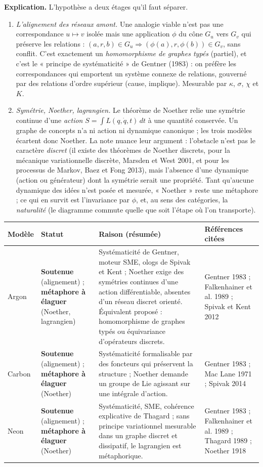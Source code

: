 \documentclass[a4paper,11pt]{article}
\makeatletter
\newenvironment{avis}{\small\renewcommand{\arraystretch}{1.15}%
\begin{longtable}{@{}>{\raggedright\arraybackslash}p{1.35cm}>{\raggedright\arraybackslash}p{2.45cm}>{\raggedright\arraybackslash}p{7.15cm}>{\raggedright\arraybackslash}p{4.4cm}@{}}
\toprule \textbf{Modèle} & \textbf{Statut} & \textbf{Raison (résumée)} & \textbf{Références citées}\\ \midrule \endhead
\bottomrule \endfoot}{\end{longtable}}
\newcommand{\st}[1]{\textbf{#1}}
\makeatother
\begin{document}
\textbf{Explication.} L'hypothèse a deux étages qu'il faut séparer.
\begin{enumerate}[itemsep=1pt]
\item \emph{L'alignement des réseaux amont.} Une analogie viable n'est pas une correspondance $u\mapsto v$ isolée mais une application $\phi$ du cône $G_u$ vers $G_v$ qui préserve les relations : $(a,r,b)\in G_u \Rightarrow (\phi(a),r,\phi(b))\in G_v$, sans conflit. C'est exactement un \emph{homomorphisme de graphes typés} (partiel), et c'est le « principe de systématicité » de Gentner (1983) : on préfère les correspondances qui emportent un système connexe de relations, gouverné par des relations d'ordre supérieur (cause, implique). Mesurable par $\kappa$, $\sigma$, $\chi$ et $K$.
\item \emph{Symétrie, Noether, lagrangien.} Le théorème de Noether relie une symétrie continue d'une \emph{action} $S=\int L(q,\dot q,t)\,dt$ à une quantité conservée. Un graphe de concepts n'a ni action ni dynamique canonique ; les trois modèles écartent donc Noether. La note nuance leur argument : l'obstacle n'est pas le caractère \emph{discret} (il existe des théorèmes de Noether discrets, pour la mécanique variationnelle discrète, Marsden et West 2001, et pour les processus de Markov, Baez et Fong 2013), mais l'absence d'une dynamique (action ou générateur) dont la symétrie serait une propriété. Tant qu'aucune dynamique des idées n'est posée et mesurée, « Noether » reste une métaphore ; ce qui en survit est l'invariance par $\phi$, et, au sens des catégories, la \emph{naturalité} (le diagramme commute quelle que soit l'étape où l'on transporte).
\end{enumerate}

\begin{avis}
Argon & \st{Soutenue} (alignement) ; \st{métaphore à élaguer} (Noether, lagrangien) & Systématicité de Gentner, moteur SME, ologs de Spivak et Kent ; Noether exige des symétries continues d'une action différentiable, absentes d'un réseau discret orienté. Équivalent proposé : homomorphisme de graphes typés ou équivariance d'opérateurs discrets. & Gentner 1983 ; Falkenhainer et al. 1989 ; Spivak et Kent 2012\\ \midrule
Carbon & \st{Soutenue} (alignement) ; \st{métaphore à élaguer} (Noether) & Systématicité formalisable par des foncteurs qui préservent la structure ; Noether demande un groupe de Lie agissant sur une intégrale d'action. & Gentner 1983 ; Mac Lane 1971 ; Spivak 2014\\ \midrule
Neon & \st{Soutenue} (alignement) ; \st{métaphore à élaguer} (Noether) & Systématicité, SME, cohérence explicative de Thagard ; sans principe variationnel mesurable dans un graphe discret et dissipatif, le lagrangien est métaphorique. & Gentner 1983 ; Falkenhainer et al. 1989 ; Thagard 1989 ; Noether 1918\\
\end{avis}
\end{document}
